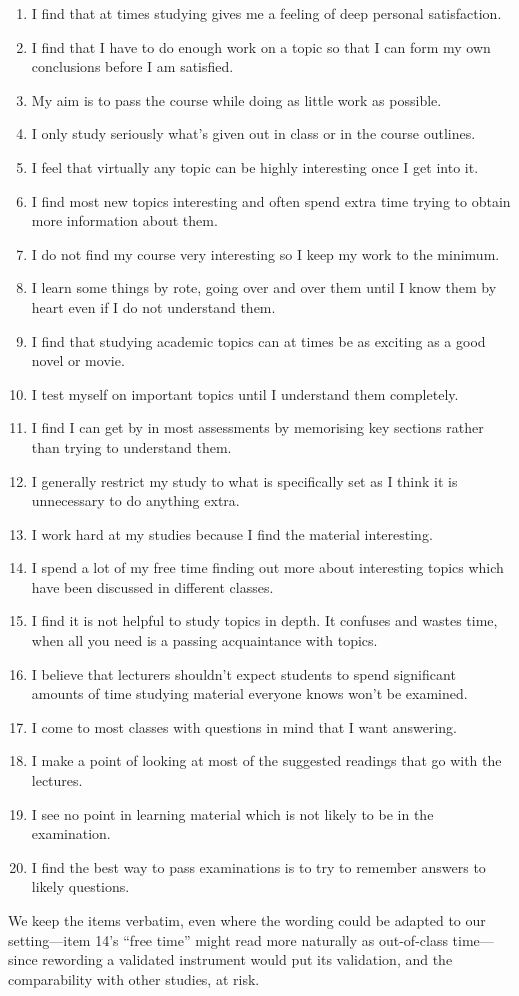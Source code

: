 \begin{enumerate}
  \item I find that at times studying gives me a feeling of deep personal
    satisfaction.
  \item I find that I have to do enough work on a topic so that I can form
    my own conclusions before I am satisfied.
  \item My aim is to pass the course while doing as little work as
    possible.
  \item I only study seriously what's given out in class or in the course
    outlines.
  \item I feel that virtually any topic can be highly interesting once I
    get into it.
  \item I find most new topics interesting and often spend extra time
    trying to obtain more information about them.
  \item I do not find my course very interesting so I keep my work to the
    minimum.
  \item I learn some things by rote, going over and over them until I know
    them by heart even if I do not understand them.
  \item I find that studying academic topics can at times be as exciting
    as a good novel or movie.
  \item I test myself on important topics until I understand them
    completely.
  \item I find I can get by in most assessments by memorising key sections
    rather than trying to understand them.
  \item I generally restrict my study to what is specifically set as I
    think it is unnecessary to do anything extra.
  \item I work hard at my studies because I find the material interesting.
  \item I spend a lot of my free time finding out more about interesting
    topics which have been discussed in different classes.
  \item I find it is not helpful to study topics in depth.
    It confuses and wastes time, when all you need is a passing
    acquaintance with topics.
  \item I believe that lecturers shouldn't expect students to spend
    significant amounts of time studying material everyone knows won't be
    examined.
  \item I come to most classes with questions in mind that I want
    answering.
  \item I make a point of looking at most of the suggested readings that
    go with the lectures.
  \item I see no point in learning material which is not likely to be in
    the examination.
  \item I find the best way to pass examinations is to try to remember
    answers to likely questions.
\end{enumerate}
We keep the items verbatim, even where the wording could be adapted to
our setting---item 14's \enquote{free time} might read more naturally as
out-of-class time---since rewording a validated instrument would put its
validation, and the comparability with other studies, at risk.

